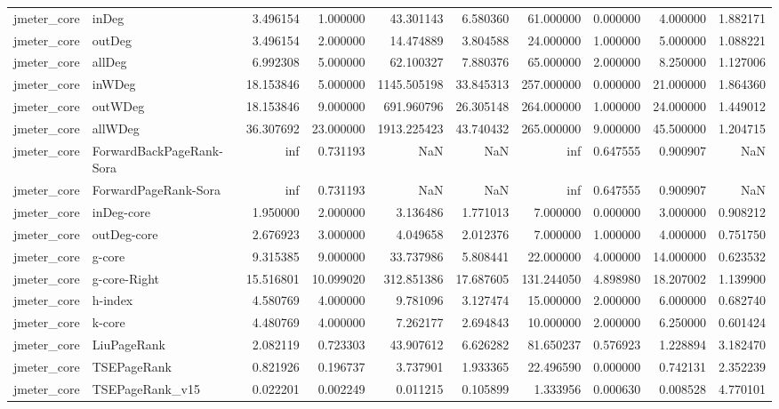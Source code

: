 \begin{tabular}{llrrrrrrrr}
jmeter_core & inDeg & 3.496154 & 1.000000 & 43.301143 & 6.580360 & 61.000000 & 0.000000 & 4.000000 & 1.882171 \\
jmeter_core & outDeg & 3.496154 & 2.000000 & 14.474889 & 3.804588 & 24.000000 & 1.000000 & 5.000000 & 1.088221 \\
jmeter_core & allDeg & 6.992308 & 5.000000 & 62.100327 & 7.880376 & 65.000000 & 2.000000 & 8.250000 & 1.127006 \\
jmeter_core & inWDeg & 18.153846 & 5.000000 & 1145.505198 & 33.845313 & 257.000000 & 0.000000 & 21.000000 & 1.864360 \\
jmeter_core & outWDeg & 18.153846 & 9.000000 & 691.960796 & 26.305148 & 264.000000 & 1.000000 & 24.000000 & 1.449012 \\
jmeter_core & allWDeg & 36.307692 & 23.000000 & 1913.225423 & 43.740432 & 265.000000 & 9.000000 & 45.500000 & 1.204715 \\
jmeter_core & ForwardBackPageRank-Sora & inf & 0.731193 & NaN & NaN & inf & 0.647555 & 0.900907 & NaN \\
jmeter_core & ForwardPageRank-Sora & inf & 0.731193 & NaN & NaN & inf & 0.647555 & 0.900907 & NaN \\
jmeter_core & inDeg-core & 1.950000 & 2.000000 & 3.136486 & 1.771013 & 7.000000 & 0.000000 & 3.000000 & 0.908212 \\
jmeter_core & outDeg-core & 2.676923 & 3.000000 & 4.049658 & 2.012376 & 7.000000 & 1.000000 & 4.000000 & 0.751750 \\
jmeter_core & g-core & 9.315385 & 9.000000 & 33.737986 & 5.808441 & 22.000000 & 4.000000 & 14.000000 & 0.623532 \\
jmeter_core & g-core-Right & 15.516801 & 10.099020 & 312.851386 & 17.687605 & 131.244050 & 4.898980 & 18.207002 & 1.139900 \\
jmeter_core & h-index & 4.580769 & 4.000000 & 9.781096 & 3.127474 & 15.000000 & 2.000000 & 6.000000 & 0.682740 \\
jmeter_core & k-core & 4.480769 & 4.000000 & 7.262177 & 2.694843 & 10.000000 & 2.000000 & 6.250000 & 0.601424 \\
jmeter_core & LiuPageRank & 2.082119 & 0.723303 & 43.907612 & 6.626282 & 81.650237 & 0.576923 & 1.228894 & 3.182470 \\
jmeter_core & TSEPageRank & 0.821926 & 0.196737 & 3.737901 & 1.933365 & 22.496590 & 0.000000 & 0.742131 & 2.352239 \\
jmeter_core & TSEPageRank_v15 & 0.022201 & 0.002249 & 0.011215 & 0.105899 & 1.333956 & 0.000630 & 0.008528 & 4.770101 \\

\end{tabular}
